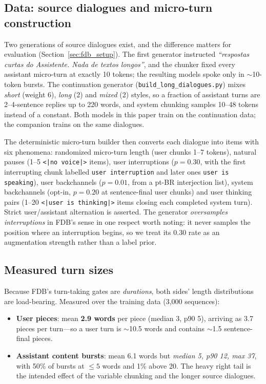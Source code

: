 \documentclass[conference]{IEEEtran}
\begin{document}
\subsection{Data: source dialogues and micro-turn construction}
Two generations of source dialogues exist, and the difference matters for
evaluation (Section~\ref{sec:fdb_setup}). The first generator instructed
\emph{``respostas curtas do Assistente. Nada de textos longos''}, and the chunker
fixed every assistant micro-turn at exactly 10 tokens; the resulting models spoke
only in $\sim$10-token bursts. The continuation generator
(\texttt{build\_long\_dialogues.py}) mixes \emph{short} (weight 6), \emph{long}
(2) and \emph{mixed} (2) styles, so a fraction of assistant turns are 2--4-sentence
replies up to 220 words, and system chunking samples 10--48 tokens instead of a
constant. Both models in this paper train on the continuation data; the
companion trains on the same dialogues.

The deterministic micro-turn builder then converts each dialogue into items with
six phenomena: randomized micro-turn length (user chunks 1--7 tokens), natural
pauses (1--5 \texttt{<|no voice|>} items), user interruptions ($p=0.30$, with the
first interrupting chunk labelled \texttt{user interruption} and later ones
\texttt{user is speaking}), user backchannels ($p=0.01$, from a pt-BR
interjection list), system backchannels (opt-in, $p=0.20$ at sentence-final user
chunks) and user thinking pairs (1--20 \texttt{<|user is thinking|>} items closing
each completed system turn). Strict user/assistant alternation is asserted. The
generator \emph{oversamples interruptions} in FDB's sense in one respect worth
noting: it never samples the position where an interruption begins, so we treat
its 0.30 rate as an augmentation strength rather than a label prior.

\subsection{Measured turn sizes}
Because FDB's turn-taking gates are \emph{durations}, both sides' length
distributions are load-bearing. Measured over the training data (3{,}000
sequences):

\begin{itemize}
  \item \textbf{User pieces}: mean \textbf{2.9 words} per piece (median 3, p90 5),
        arriving as 3.7 pieces per turn---so a user turn is $\sim$10.5 words and
        contains $\sim$1.5 sentence-final pieces.
  \item \textbf{Assistant content bursts}: mean 6.1 words but \emph{median 5,
        p90 12, max 37}, with 50\% of bursts at ${\le}5$ words and 1\% above 20.
        The heavy right tail is the intended effect of the variable chunking and
        the longer source dialogues.
\end{itemize}
\end{document}

